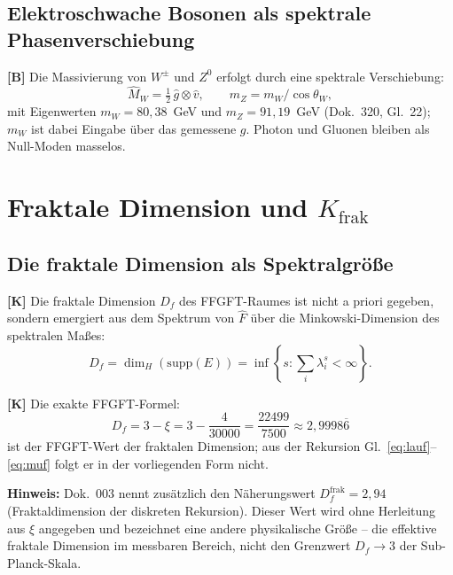 \subsection{Elektroschwache Bosonen als spektrale Phasenverschiebung}

\textbf{[B]} Die Massivierung von $W^\pm$ und $Z^0$ erfolgt durch
eine spektrale Verschiebung:
\begin{equation}
  \hat{M}_{W} = \tfrac{1}{2}\,\hat{g} \otimes \hat{v},
  \qquad m_Z = m_W/\cos\theta_W,
  \label{eq:MWZ}
\end{equation}
mit Eigenwerten $m_W = 80{,}38$~GeV und $m_Z = 91{,}19$~GeV (Dok.~320,
Gl.~22); $m_W$ ist dabei Eingabe über das gemessene $g$.
Photon und Gluonen bleiben als Null-Moden masselos.

\section{Fraktale Dimension und $K_{\mathrm{frak}}$}
\label{sec:dim}

\subsection{Die fraktale Dimension als Spektralgröße}

\textbf{[K]} Die fraktale Dimension $D_f$ des FFGFT-Raumes ist nicht
a priori gegeben, sondern emergiert aus dem Spektrum von $\hat{F}$
über die Minkowski-Dimension des spektralen Maßes:
\begin{equation}
  D_f = \dim_H(\mathrm{supp}(E))
  = \inf\!\left\{ s : \sum_i \lambda_i^s < \infty \right\}.
  \label{eq:Df_def}
\end{equation}

\textbf{[K]} Die exakte FFGFT-Formel:
\begin{equation}
  \boxed{D_f = 3 - \xi = 3 - \frac{4}{30000}
  = \frac{22499}{7500} \approx 2{,}9998\overline{6}}
  \label{eq:Df}
\end{equation}
ist der FFGFT-Wert der fraktalen Dimension; aus der Rekursion
Gl.~\eqref{eq:lauf}--\eqref{eq:muf} folgt er in der vorliegenden Form nicht.

\textbf{Hinweis:} Dok.~003 nennt zusätzlich den Näherungswert
$D_f^{\mathrm{frak}} = 2{,}94$ (Fraktaldimension der diskreten
Rekursion). Dieser Wert wird ohne Herleitung aus $\xi$ angegeben
und bezeichnet eine andere physikalische Größe -- die effektive
fraktale Dimension im messbaren Bereich, nicht den Grenzwert
$D_f \to 3$ der Sub-Planck-Skala.

